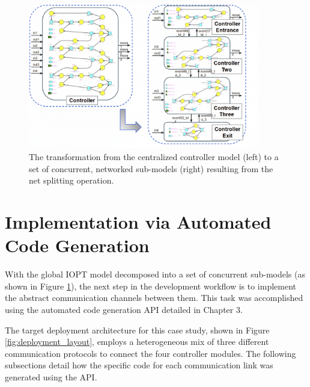\begin{figure}[htb]
    \centering
    \includegraphics[width=0.9\textwidth]{Chapters/Figures/controller_decomposition.png}
    \caption{The transformation from the centralized controller model (left) to a set of concurrent, networked sub-models (right) resulting from the net splitting operation.}
    \label{fig:decomposed_model}
\end{figure}


\section{Implementation via Automated Code Generation}
\label{sec:use_case_implementation}

With the global IOPT model decomposed into a set of concurrent sub-models (as shown in Figure \ref{fig:decomposed_model}), the next step in the development workflow is to implement the abstract communication channels between them. This task was accomplished using the automated code generation API detailed in Chapter 3.

The target deployment architecture for this case study, shown in Figure \ref{fig:deployment_layout}, employs a heterogeneous mix of three different communication protocols to connect the four controller modules. The following subsections detail how the specific code for each communication link was generated using the API.

